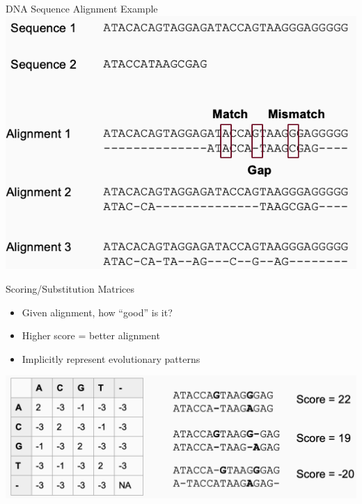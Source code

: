 \documentclass[
  ignorenonframetext,
]{beamer}
\providecommand{\tightlist}{%
  \setlength{\itemsep}{0pt}\setlength{\parskip}{0pt}}
\begin{document}
\begin{frame}{DNA Sequence Alignment Example}
\label{dna-sequence-alignment-example}
\includegraphics{figs/sequence_align.png}
\end{frame}

\begin{frame}{Scoring/Substitution Matrices}
\label{scoringsubstitution-matrices}
\Large

\begin{itemize}
\tightlist
\item
  Given alignment, how ``good'' is it?
\item
  Higher score = better alignment
\item
  Implicitly represent evolutionary patterns
\end{itemize}

\includegraphics{figs/scoring.png}
\end{frame}
\end{document}
